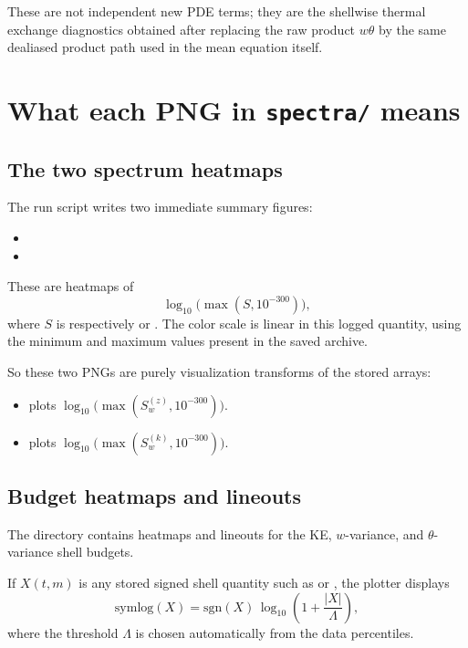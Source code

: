 \documentclass[11pt]{article}
\begin{document}
These are not independent new PDE terms; they are the shellwise thermal
exchange diagnostics obtained after replacing the raw product \(w\theta\) by the
same dealiased product path used in the mean equation itself.

\section{What each PNG in \texttt{spectra/} means}

\subsection{The two spectrum heatmaps}

The run script writes two immediate summary figures:
\begin{itemize}
\item {}
\item {}
\end{itemize}

These are heatmaps of
\[
\log_{10}\!\bigl(\max(S,10^{-300})\bigr),
\]
where \(S\) is respectively  or . The
color scale is linear in this logged quantity, using the minimum and maximum
values present in the saved archive.

So these two PNGs are purely visualization transforms of the stored arrays:
\begin{itemize}
\item {} plots
  \(\log_{10}\!\bigl(\max(S_w^{(z)},10^{-300})\bigr)\).
\item {} plots
  \(\log_{10}\!\bigl(\max(S_w^{(k)},10^{-300})\bigr)\).
\end{itemize}

\subsection{Budget heatmaps and lineouts}

The directory  contains heatmaps and lineouts for the
KE, \(w\)-variance, and \(\theta\)-variance shell budgets.

If \(X(t,m)\) is any stored signed shell quantity such as
 or , the
plotter displays
\[
\mathrm{symlog}(X)
=
\mathrm{sgn}(X)\,
\log_{10}\!\left(1 + \frac{|X|}{\Lambda}\right),
\]
where the threshold \(\Lambda\) is chosen automatically from the data percentiles.
\end{document}
